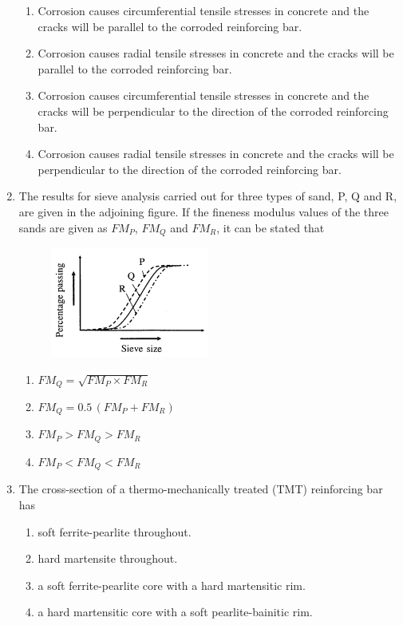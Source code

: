 \documentclass[journal,12pt,onecolumn]{IEEEtran}
\theoremstyle{remark}
\begin{document}
\begin{enumerate}
\hfill{}
\begin{enumerate}
\item Corrosion causes circumferential tensile stresses in concrete and the cracks will be parallel to the corroded reinforcing bar.
\item Corrosion causes radial tensile stresses in concrete and the cracks will be parallel to the corroded reinforcing bar.
\item Corrosion causes circumferential tensile stresses in concrete and the cracks will be perpendicular to the direction of the corroded reinforcing bar.
\item Corrosion causes radial tensile stresses in concrete and the cracks will be perpendicular to the direction of the corroded reinforcing bar.
\end{enumerate}

\item The results for sieve analysis carried out for three types of sand, P, Q and R, are given in the adjoining figure. If the fineness modulus values of the three sands are given as $FM_P$, $FM_Q$ and $FM_R$, it can be stated that

\hfill{}
\begin{figure}[H]
\centering
\includegraphics[width=0.4\columnwidth]{figs/q7.png}
\caption*{}
\label{fig:Q.7}
\end{figure}
\begin{enumerate}
\item $FM_Q = \sqrt{FM_P \times FM_R}$
\item $FM_Q = 0.5 \, (FM_P + FM_R)$
\item $FM_P > FM_Q > FM_R$
\item $FM_P < FM_Q < FM_R$
\end{enumerate}

\item The cross-section of a thermo-mechanically treated (TMT) reinforcing bar has

\hfill{}
\begin{enumerate}
\item soft ferrite-pearlite throughout.
\item hard martensite throughout.
\item a soft ferrite-pearlite core with a hard martensitic rim.
\item a hard martensitic core with a soft pearlite-bainitic rim.
\end{enumerate}


\end{enumerate}
\end{document}
